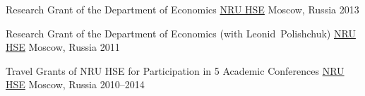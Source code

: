 \begin{cvhonors}
  \cvhonor
    {Research Grant of the Department of Economics} %
    {\href{http://www.hse.ru/en/}{NRU HSE}} %
    {Moscow, Russia} %
    {2013} %

  \cvhonor
    {Research Grant of the Department of Economics (with Leonid~Polishchuk)} %
    {\href{http://www.hse.ru/en/}{NRU HSE}} %
    {Moscow, Russia} %
    {2011} %

  \cvhonor
    {Travel Grants of NRU HSE for Participation in 5 Academic Conferences} %
    {\href{http://www.hse.ru/en/}{NRU HSE}} %
    {Moscow, Russia} %
    {2010--2014} %

\end{cvhonors}






